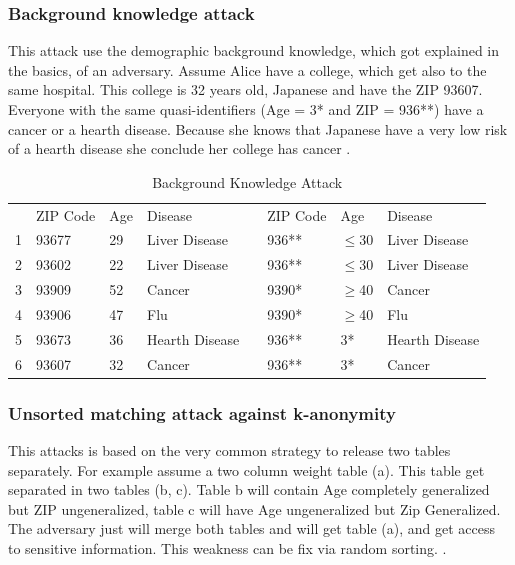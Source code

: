 \documentclass{llncs}
\begin{document}
\subsubsection{Background knowledge attack}
This attack use the demographic background knowledge, which got explained in the basics, of an adversary. Assume Alice have a college, which get also to the same hospital. This college is 32 years old, Japanese and have the ZIP 93607. Everyone with the same quasi-identifiers (Age = 3* and ZIP = 936**) have a cancer or a hearth disease. Because she knows that Japanese have a very low risk of a hearth disease she conclude her college has cancer \cite{ldiversity}.
\begin{table}[]
	\centering
	\caption{Background Knowledge Attack}
	\label{tablebackground}
	\begin{tabular}{@{}llllllll@{}}
		\cmidrule(r){1-4} \cmidrule(l){6-8}
		& ZIP Code & Age & Disease        &  & ZIP Code & Age      & Disease        \\ \cmidrule(r){1-4} \cmidrule(l){6-8} 
		1 & 93677    & 29  & Liver Disease   &  & 936**    & $\leq$30 & Liver Disease   \\
		2 & 93602    & 22  & Liver Disease   &  & 936**    & $\leq$30 & Liver Disease   \\
		3 & 93909    & 52  & Cancer         &  & 9390*    & $\geq$40 & Cancer         \\
		4 & 93906    & 47  & Flu            &  & 9390*    & $\geq$40 & Flu            \\
		5 & 93673    & 36  & Hearth Disease &  & 936**    & 3*       & Hearth Disease \\
		6 & 93607    & 32  & Cancer         &  & 936**    & 3*       & Cancer         \\ \cmidrule(r){1-4} \cmidrule(l){6-8} 
	\end{tabular}
\end{table}

\subsubsection{Unsorted matching attack against k-anonymity}
This attacks is based on the very common strategy to release two tables separately. For example assume a two column weight table (a). This table get separated in two tables (b, c). Table b will contain Age completely generalized but ZIP ungeneralized, table c will have Age ungeneralized but Zip Generalized. The adversary just will merge both tables and will get table (a), and get access to sensitive information. This weakness can be fix via random sorting. \cite{meyerson2004complexity}.
\end{document}
